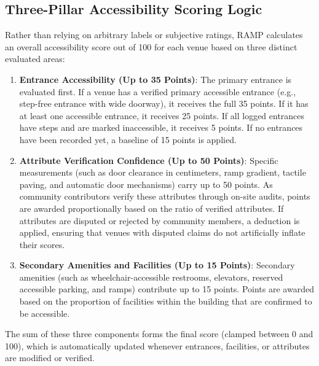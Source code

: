 \documentclass[12pt,a4paper]{report}
\begin{document}
\subsection{Three-Pillar Accessibility Scoring Logic}
Rather than relying on arbitrary labels or subjective ratings, RAMP calculates an overall accessibility score out of 100 for each venue based on three distinct evaluated areas:
\begin{enumerate}
    \item \textbf{Entrance Accessibility (Up to 35 Points)}:
    The primary entrance is evaluated first. If a venue has a verified primary accessible entrance (e.g., step-free entrance with wide doorway), it receives the full 35 points. If it has at least one accessible entrance, it receives 25 points. If all logged entrances have steps and are marked inaccessible, it receives 5 points. If no entrances have been recorded yet, a baseline of 15 points is applied.
    
    \item \textbf{Attribute Verification Confidence (Up to 50 Points)}:
    Specific measurements (such as door clearance in centimeters, ramp gradient, tactile paving, and automatic door mechanisms) carry up to 50 points. As community contributors verify these attributes through on-site audits, points are awarded proportionally based on the ratio of verified attributes. If attributes are disputed or rejected by community members, a deduction is applied, ensuring that venues with disputed claims do not artificially inflate their scores.
    
    \item \textbf{Secondary Amenities and Facilities (Up to 15 Points)}:
    Secondary amenities (such as wheelchair-accessible restrooms, elevators, reserved accessible parking, and ramps) contribute up to 15 points. Points are awarded based on the proportion of facilities within the building that are confirmed to be accessible.
\end{enumerate}
The sum of these three components forms the final score (clamped between 0 and 100), which is automatically updated whenever entrances, facilities, or attributes are modified or verified.
\end{document}
